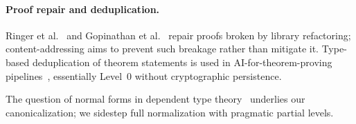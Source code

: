 
\paragraph{Proof repair and deduplication.}
Ringer et al.~\cite{ringer2021repair} and Gopinathan et
al.~\cite{gopinathan2023repair} repair proofs broken by library
refactoring; content-addressing aims to prevent such breakage rather
than mitigate it.
  Type-based deduplication of theorem statements is
used in AI-for-theorem-proving pipelines~\cite{syntheticthm},
essentially Level~0 without cryptographic persistence.


The question of
normal forms in dependent type theory~\cite{abel2018decidability,
coquand1991algorithm} underlies our canonicalization; we sidestep full
normalization with pragmatic partial levels.

